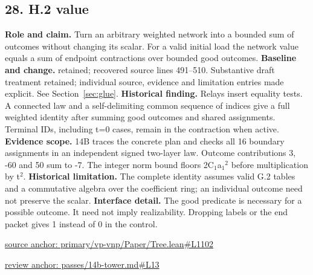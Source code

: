 \documentclass[11pt,letterpaper]{article}
\theoremstyle{definition}\newtheorem{definition}[theorem]{Definition}\newtheorem{example}[theorem]{Example}
\theoremstyle{remark}\newtheorem{remark}[theorem]{Remark}
\begin{document}
\subsection*{28. H.2 value}
\textbf{Role and claim.} Turn an arbitrary weighted network into a bounded sum of outcomes without changing its scalar. For a valid initial load the network value equals a sum of endpoint contractions over bounded good outcomes.
\textbf{Baseline and change.} retained; recovered source lines 491--510. Substantive draft treatment retained; individual source, evidence and limitation entries made explicit. See Section~\ref{sec:glue}.
\textbf{Historical finding.} Relays insert equality tests. A connected law and a self-delimiting common sequence of indices give a full weighted identity after summing good outcomes and shared assignments. Terminal IDs, including t=0 cases, remain in the contraction when active.
\textbf{Evidence scope.} 14B traces the concrete plan and checks all 16 boundary assignments in an independent signed two-layer law. Outcome contributions 3, -60 and 50 sum to -7. The integer norm bound floors 2C\ensuremath{{}_1}a\ensuremath{{}_1}\ensuremath{{}^2} before multiplication by t\ensuremath{{}^2}.
\textbf{Historical limitation.} The complete identity assumes valid G.2 tables and a commutative algebra over the coefficient ring; an individual outcome need not preserve the scalar.
\textbf{Interface detail.} The good predicate is necessary for a possible outcome. It need not imply realizability. Dropping labels or the end packet gives 1 instead of 0 in the control.
\par\href{https://github.com/nousentllc/VP-VNP-Review/blob/8a7976933b6b2b4ffda1ad3a0dfb5fc6b6f023e8/primary/vp-vnp/Paper/Tree.lean\#L1102}{source anchor: primary/vp-vnp/Paper/Tree.lean\#L1102}
\par\href{https://github.com/nousentllc/VP-VNP-Review/blob/8a7976933b6b2b4ffda1ad3a0dfb5fc6b6f023e8/passes/14b-tower.md\#L13}{review anchor: passes/14b-tower.md\#L13}
\goodbreak
\end{document}
